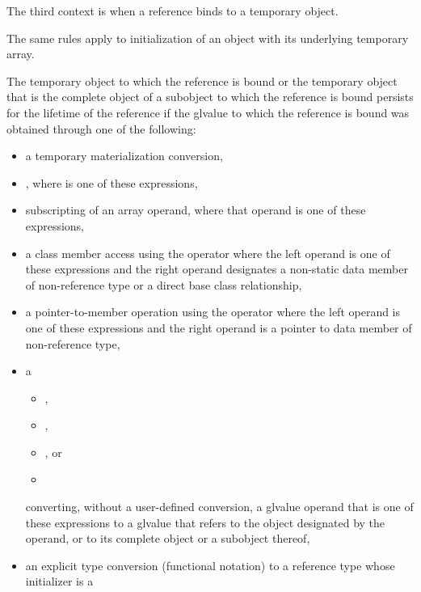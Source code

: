 \pnum
The third context is when a reference binds to a temporary object.
\begin{footnote}
The same rules apply to initialization of an
   object with its
  underlying temporary array.
\end{footnote}
The temporary object to which the reference is bound or the temporary object
that is the complete object of a subobject to which the reference is bound
persists for the lifetime of the reference if the glvalue
to which the reference is bound
was obtained through one of the following:
\begin{itemize}
\item
  a temporary materialization conversion,
\item
  \tcode{(}  \tcode{)},
  where  is one of these expressions,
\item
  subscripting of an array operand,
  where that operand is one of these expressions,
\item
  a class member access using the  operator
  where the left operand is one of these expressions and
  the right operand designates
  a non-static data member of non-reference type or
  a direct base class relationship,
\item
  a pointer-to-member operation using the  operator
  where the left operand is one of these expressions and
  the right operand is a pointer to data member of non-reference type,
\item
  a
  \begin{itemize}
  \item {},
  \item {},
  \item {}, or
  \item {}
  \end{itemize}
  converting, without a user-defined conversion,
  a glvalue operand that is one of these expressions
  to a glvalue that refers
  to the object designated by the operand, or
  to its complete object or a subobject thereof,
\item
  an explicit type conversion (functional notation)
  to a reference type whose initializer is a 

\end{itemize}

